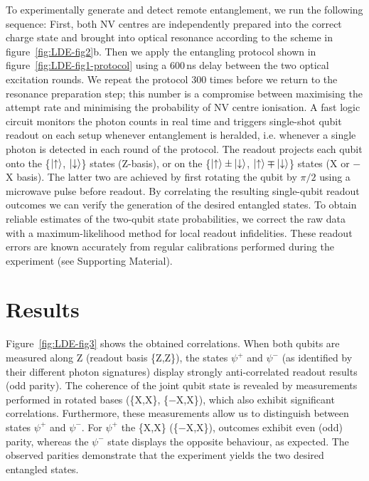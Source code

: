To experimentally generate and detect remote entanglement, we run the following sequence: First, both NV centres are independently prepared into the correct charge state and brought into optical resonance according to the scheme in figure~\ref{fig:LDE-fig2}b. Then we apply the entangling protocol shown in figure~\ref{fig:LDE-fig1-protocol} using a 600$\,$ns delay between the two optical excitation rounds. We repeat the protocol 300 times before we return to the resonance preparation step; this number is a compromise between maximising the attempt rate and minimising the probability of NV centre ionisation. A fast logic circuit monitors the photon counts in real time and triggers single-shot qubit readout on each setup whenever entanglement is heralded, i.e. whenever a single photon is detected in each round of the protocol. The readout projects each qubit onto the \{$\left|\uparrow\right\rangle$, $\left|\downarrow\right\rangle$\} states (Z-basis), or on the \{$\left|\uparrow\right\rangle \pm \left|\downarrow\right\rangle$, $\left|\uparrow\right\rangle \mp \left|\downarrow\right\rangle$\} states (X or $-$X basis). The latter two are achieved by first rotating the qubit by $\pi/2$ using a microwave pulse before readout. By correlating the resulting single-qubit readout outcomes we can verify the generation of the desired entangled states. To obtain reliable estimates of the two-qubit state probabilities, we correct the raw data with a maximum-likelihood method for local readout infidelities. These readout errors are known accurately from regular calibrations performed during the experiment (see Supporting Material).

\section{Results}

Figure~\ref{fig:LDE-fig3} shows the obtained correlations. When both qubits are measured along Z (readout basis \{Z,Z\}), the states $\psi^+$ and $\psi^-$ (as identified by their different photon signatures) display strongly anti-correlated readout results (odd parity). The coherence of the joint qubit state is revealed by measurements performed in rotated bases (\{X,X\}, \{$-$X,X\}), which also exhibit significant correlations. Furthermore, these measurements allow us to distinguish between states $\psi^+$ and $\psi^-$. For $\psi^+$ the \{X,X\} (\{$-$X,X\}), outcomes exhibit even (odd) parity, whereas the $\psi^-$ state displays the opposite behaviour, as expected. The observed parities demonstrate that the experiment yields the two desired entangled states.

